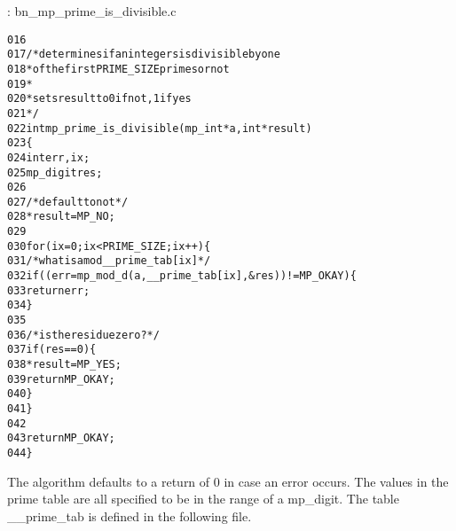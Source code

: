 \documentclass[b5paper]{book}
\begin{document}
\vspace{+3mm}\begin{small}
\hspace{-5.1mm}{\bf File}: bn\_mp\_prime\_is\_divisible.c
\vspace{-3mm}
\begin{alltt}
016   
017   /* determines if an integers is divisible by one 
018    * of the first PRIME_SIZE primes or not
019    *
020    * sets result to 0 if not, 1 if yes
021    */
022   int mp_prime_is_divisible (mp_int * a, int *result)
023   \{
024     int     err, ix;
025     mp_digit res;
026   
027     /* default to not */
028     *result = MP_NO;
029   
030     for (ix = 0; ix < PRIME_SIZE; ix++) \{
031       /* what is a mod __prime_tab[ix] */
032       if ((err = mp_mod_d (a, __prime_tab[ix], &res)) != MP_OKAY) \{
033         return err;
034       \}
035   
036       /* is the residue zero? */
037       if (res == 0) \{
038         *result = MP_YES;
039         return MP_OKAY;
040       \}
041     \}
042   
043     return MP_OKAY;
044   \}
\end{alltt}
\end{small}

The algorithm defaults to a return of $0$ in case an error occurs.  The values in the prime table are all specified to be in the range of a 
mp\_digit.  The table \_\_prime\_tab is defined in the following file.
\end{document}
